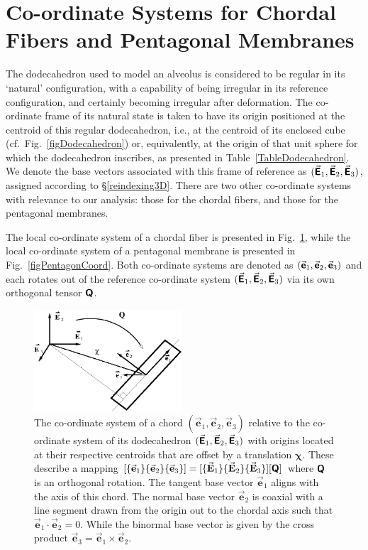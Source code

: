 \section{Co-ordinate Systems for Chordal Fibers and Pentagonal Membranes}

The dodecahedron used to model an alveolus is considered to be regular in its `natural' configuration, with a capability of being irregular in its reference configuration, and certainly becoming irregular after deformation.  The co-ordinate frame of its natural state is taken to have its origin positioned at the centroid of this regular dodecahedron, i.e., at the centroid of its enclosed cube (cf.\ Fig.~\ref{figDodecahedron}) or, equivalently, at the origin of that unit sphere for which the dodecahedron inscribes, as presented in Table~\ref{TableDodecahedron}.  We denote the base vectors associated with this frame of reference as $( \vec{\boldsymbol{\mathsf{E}}}_1 , \vec{\boldsymbol{\mathsf{E}}}_2 , \vec{\boldsymbol{\mathsf{E}}}_3 )$, assigned according to \S\ref{reindexing3D}.  There are two other co-ordinate systems with relevance to our analysis: those for the chordal fibers, and those for the pentagonal membranes.

The local co-ordinate system of a chordal fiber is presented in Fig.~\ref{figchord}, while the local co-ordinate system of a pentagonal membrane is presented in Fig.~\ref{figPentagonCoord}.  Both co-ordinate systems are denoted as $( \vec{\boldsymbol{\mathsf{e}}}_1 , \vec{\boldsymbol{\mathsf{e}}}_2 , \vec{\boldsymbol{\mathsf{e}}}_3 )$ and each rotates out of the reference co-ordinate system $( \vec{\boldsymbol{\mathsf{E}}}_1 , \vec{\boldsymbol{\mathsf{E}}}_2 , \vec{\boldsymbol{\mathsf{E}}}_3 )$ via its own orthogonal tensor $\boldsymbol{\mathsf{Q}}$.

\begin{figure}
    \centering
    \includegraphics[width=5.5cm]{figures/chord.png}
    \caption{The co-ordinate system of a chord $( \vec{\mathbf{e}}_1 , \vec{\mathbf{e}}_2 , \vec{\mathbf{e}}_3 )$ relative to the co-ordinate system of its dodecahedron $( \vec{\boldsymbol{\mathsf{E}}}_1 , \vec{\boldsymbol{\mathsf{E}}}_2 , \vec{\boldsymbol{\mathsf{E}}}_3 )$ with origins located at their respective centroids that are offset by a translation $\boldsymbol{\chi}$.  These describe a mapping $[ \{ \vec{\mathbf{e}}_1 \} \{ \vec{\mathbf{e}}_2 \} \{ \vec{\mathbf{e}}_3 \} ] = [ \{ \vec{\mathbf{E}}_1 \} \{ \vec{\mathbf{E}}_2 \} \{ \vec{\mathbf{E}}_3 \} ] [ \boldsymbol{\mathsf{Q}} ]$ where $\boldsymbol{\mathsf{Q}}$ is an orthogonal rotation.  The tangent base vector $\vec{\mathbf{e}}_1$ aligns with the axis of this chord. The normal base vector $\vec{\mathbf{e}}_2$ is coaxial with a line segment drawn from the origin out to the chordal axis such that $\vec{\mathbf{e}}_1 \cdot \vec{\mathbf{e}}_2 = 0$. While the binormal base vector is given by the cross product $\vec{\mathbf{e}}_3 = \vec{\mathbf{e}}_1 \times \vec{\mathbf{e}}_2$.}
    \label{figchord}
\end{figure}

